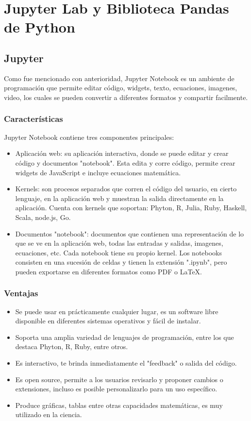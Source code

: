 \documentclass{article}
\begin{document}
\section{Jupyter Lab y Biblioteca Pandas de Python}

\subsection{Jupyter}

Como fue mencionado con anterioridad, Jupyter Notebook es un ambiente de programación que permite editar código, widgets, texto, ecuaciones, imagenes, video, los cuales se pueden convertir a diferentes formatos y compartir facilmente. 
\\

\subsubsection{Características}
Jupyter Notebook contiene tres componentes principales: 
\begin{itemize}
\item Aplicación web: su aplicación interactiva, donde se puede editar y crear código y documentos "notebook". Esta edita y corre código, permite crear widgets de JavaScript e incluye ecuaciones matemática.
\item Kernels: son procesos separados que corren el código del usuario, en cierto lenguaje, en la aplicación web y muestran la salida directamente en la aplicación. Cuenta con kernels que soportan: Phyton, R, Julia, Ruby, Haskell, Scala, node.js, Go.
\item Documentos "notebook": documentos que contienen una representación de lo que se ve en la aplicación web, todas las entradas y salidas, imagenes, ecuaciones, etc. Cada notebook tiene su propio kernel. Los notebooks consisten en una sucesión de celdas y tienen la extensión ".ipynb", pero pueden exportarse en diferentes formatos como PDF o LaTeX.
\end{itemize}

\subsubsection{Ventajas}
\begin{itemize}
\item Se puede usar en prácticamente cualquier lugar, es un software libre disponible en diferentes sistemas operativos y fácil de instalar. 
\item Soporta una amplia variedad de lenguajes de programación, entre los que destaca Phyton, R, Ruby, entre otros.
\item Es interactivo, te brinda inmediatamente el "feedback" o salida del código.
\item Es open source, permite a los usuarios revisarlo y proponer cambios o extensiones, incluso es posible personalizarlo para un uso específico.
\item Produce gráficas, tablas entre otras capacidades matemáticas, es muy utilizado en la ciencia.
\end{itemize}
\end{document}
